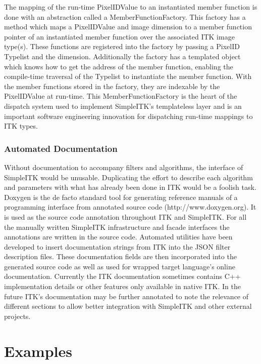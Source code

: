 \documentclass{frontiersMED} %
\begin{document}
The mapping of the run-time PixelIDValue to an instantiated member
function is done with an abstraction called a
MemberFunctionFactory. This factory has a method which maps a
PixelIDValue and image dimension to a member function pointer of an
instantiated member function over the associated ITK image
type(s). These functions are registered into the factory by passing a
PixelID Typelist and the dimension. Additionally the factory has a
templated object which knows how to get the address of  the member
function, enabling the compile-time traversal of the Typelist to
instantiate the member function.  With the member functions stored in
the factory, they are indexable by the PixelIDValue at run-time. This
MemberFunctionFactory is the heart of the dispatch system used to
implement SimpleITK's templateless layer and is an important software
engineering innovation for dispatching run-time mappings to ITK types.

\subsubsection{Automated Documentation}
Without documentation to accompany filters and algorithms, the
interface of SimpleITK would be unusable. Duplicating the effort to
describe each algorithm and parameters with what has already been done
in ITK would be a foolish task. Doxygen is the de facto standard tool
for generating reference manuals of a programming interface from
annotated source code (http://www.doxygen.org). It is used as the source code annotation
throughout ITK and SimpleITK. For all the manually written SimpleITK
infrastructure and facade interfaces the annotations are written in
the source code. Automated utilities have been developed to insert
documentation strings from ITK into the JSON filter description files. These
documentation fields are then incorporated into the generated source
code as well as used for wrapped target language's online
documentation. Currently the ITK documentation sometimes contains C++
implementation details or other features only available in native ITK.
In the future ITK's documentation may be further annotated to
note the relevance of different sections to allow better
integration with SimpleITK and other external projects.



\section{Examples}
\end{document}
